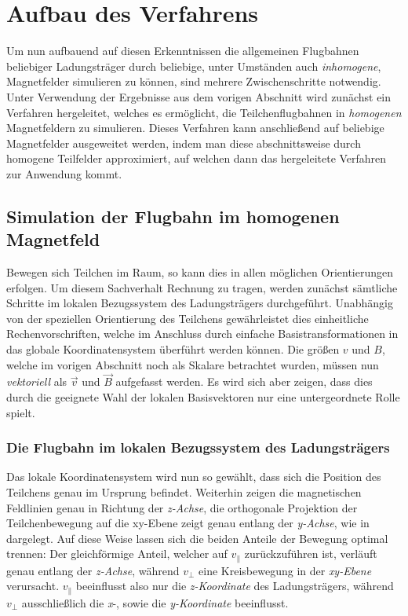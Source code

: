 \chapter{Aufbau des Verfahrens}

Um nun aufbauend auf diesen Erkenntnissen die allgemeinen Flugbahnen beliebiger Ladungstr\"ager durch beliebige, unter Umst\"anden
auch \textit{inhomogene}, Magnetfelder simulieren zu k\"onnen, sind mehrere Zwischenschritte notwendig.
Unter Verwendung der Ergebnisse aus dem vorigen Abschnitt wird zun\"achst ein Verfahren hergeleitet, welches es erm\"oglicht,
die Teilchenflugbahnen in \textit{homogenen} Magnetfeldern zu simulieren. Dieses Verfahren kann anschlie{\ss}end auf beliebige
Magnetfelder ausgeweitet werden, indem man diese abschnittsweise durch homogene Teilfelder approximiert, auf welchen dann das
hergeleitete Verfahren zur Anwendung kommt.

\section{Simulation der Flugbahn im homogenen Magnetfeld}

Bewegen sich Teilchen im Raum, so kann dies in allen m\"oglichen Orientierungen erfolgen. Um diesem Sachverhalt Rechnung zu tragen,
werden zun\"achst s\"amtliche Schritte im lokalen Bezugssystem des Ladungstr\"agers durchgef\"uhrt. Unabh\"angig von der speziellen
Orientierung des Teilchens gew\"ahrleistet dies einheitliche Rechenvorschriften, welche im Anschluss durch einfache
Basistransformationen in das globale Koordinatensystem \"uberf\"uhrt werden k\"onnen. Die gr\"o{\ss}en \(v\) und \(B\), welche
im vorigen Abschnitt noch als Skalare betrachtet wurden, m\"ussen nun \textit{vektoriell} als \(\vec{v}\) und \(\vec{B}\)
aufgefasst werden. Es wird sich aber zeigen, dass dies durch die geeignete Wahl der lokalen Basisvektoren nur eine untergeordnete Rolle
spielt.

\subsection{Die Flugbahn im lokalen Bezugssystem des Ladungstr\"agers}
\label{sec:lokales_bezugssystem}

Das lokale Koordinatensystem wird nun so gew\"ahlt, dass sich die Position des Teilchens genau im Ursprung befindet.
Weiterhin zeigen die magnetischen
Feldlinien genau in Richtung der \textit{z-Achse}, die orthogonale Projektion der Teilchenbewegung auf die xy-Ebene zeigt genau
entlang der \textit{y-Achse}, wie in  dargelegt. Auf diese Weise lassen sich die beiden Anteile der
Bewegung optimal trennen: Der gleichf\"ormige Anteil, welcher auf \(v_\parallel\) zur\"uckzuf\"uhren ist,
verl\"auft genau entlang der \textit{z-Achse}, w\"ahrend \(v_\perp\) eine Kreisbewegung in der \textit{xy-Ebene} verursacht.
\(v_\parallel\) beeinflusst also nur die \textit{z-Koordinate} des Ladungstr\"agers, w\"ahrend \(v_\perp\) ausschlie{\ss}lich die
\textit{x}-, sowie die \textit{y-Koordinate} beeinflusst.

